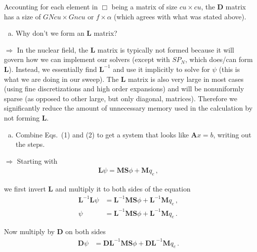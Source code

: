 \documentclass[10pt]{article}
\begin{document}
Accounting for each element in $\Box$ being a matrix of size $cu \times cu$, the $\textbf{D}$ matrix has a size of $GNcu \times Gncu$ or $f \times \alpha$ (which agrees with what was stated above).

%
%
%

\newpage
\begin{enumerate}[(d)]
\item Why don't we form an $\textbf{L}$ matrix?
\end{enumerate}

$\Rightarrow$ In the nuclear field, the $\textbf{L}$ matrix is typically not formed because it will govern how we can implement our solvers (except with $SP_N$, which does/can form $\textbf{L}$). Instead, we essentially find $\textbf{L}^{-1}$ and use it implicitly to solve for $\psi$ (this is what we are doing in our sweep). The $\textbf{L}$ matrix is also very large in most cases (using fine discretizations and high order expansions) and will be nonuniformly sparse (as opposed to other large, but only diagonal, matrices). Therefore we significantly reduce the amount of unnecessary memory used in the calculation by not forming $\textbf{L}$.

%
%
%

\vspace{10pt}
\begin{enumerate}[(e)]
\item Combine Eqs.~(1) and (2) to get a system that looks like $\textbf{A}x = b$, writing out the steps.
\end{enumerate}

$\Rightarrow$ Starting with
%
\begin{align*}
    \textbf{L} \psi = \textbf{MS} \phi + \textbf{M} q_e\,,
\end{align*}

we first invert \textbf{L} and multiply it to both sides of the equation
%
\begin{align*}
    \textbf{L} ^{-1}\textbf{L} \psi &= \textbf{L} ^{-1}\textbf{MS} \phi + \textbf{L} ^{-1}\textbf{M} q_e\,, \\
     \psi &= \textbf{L} ^{-1}\textbf{MS} \phi + \textbf{L} ^{-1}\textbf{M} q_e\,.
\end{align*} 

Now multiply by \textbf{D} on both sides
%
\begin{align*}
    \textbf{D}\psi &= \textbf{D}\textbf{L} ^{-1}\textbf{MS} \phi + \textbf{D}\textbf{L} ^{-1}\textbf{M} q_e\,.
\end{align*} 
\end{document}
